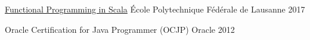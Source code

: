 




\begin{cvhonors}

  \cvhonor
    {\href{https://www.coursera.org/account/accomplishments/specialization/9NNUCHVNV36F}{Functional Programming in Scala}}
    {\hspace{0.5em}École Polytechnique Fédérale de Lausanne} %
    {2017}

  \cvhonor
    {Oracle Certification for Java Programmer (OCJP)} %
    {\hspace{0.5em}Oracle} %
    {2012} %

\end{cvhonors}
